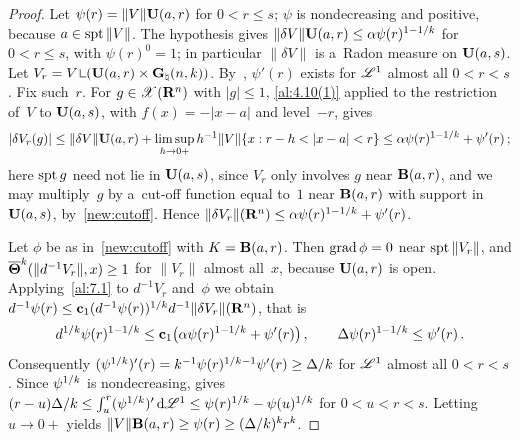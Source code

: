 \begin{proof}
    Let $\psi(r) = \|V\| \mathbf{U}(a,r)$ for $0 < r \le s$; $\psi$ is nondecreasing and positive,
    because $a \in \operatorname{spt} \|V\|$. The hypothesis gives $\|\delta V\| \mathbf{U}(a,r) \le \alpha
    \psi(r)^{1 - 1/k}$ for $0 < r \le s$, with $\psi(r)^0 = 1$; in particular $\|\delta V\|$ is
    a~Radon measure on $\mathbf{U}(a,s)$. Let $V_r = V \restrict (\oball{a}{r} \times
    \pgrass{\adim}{\vdim})$. By~\cite[2.9.19]{Federer1969}, $\psi'(r)$ exists for $\mathscr{L}^1$ almost all
    $0 < r < s$. Fix such~$r$. For $g \in \mathscr{X}(\mathbf{R}^{n})$ with $|g| \le 1$, \ref{al:4.10(1)} applied
    to the restriction of~$V$ to $\mathbf{U}(a,s)$, with $f(x) = -|x - a|$ and level~$-r$, gives
    \begin{displaymath}
        |\delta V_r(g)| \le \|\delta V\| \mathbf{U}(a,r) + \limsup_{h \to 0+} h^{-1} \|V\| \{ x : r -
        h < |x - a| < r \} \le \alpha \psi(r)^{1-1/k} + \psi'(r) \,;
    \end{displaymath}
    here $\operatorname{spt} g$ need not lie in $\mathbf{U}(a,s)$, since $V_r$ only involves $g$ near $\mathbf{B}(a,r)$,
    and we may multiply~$g$ by a~cut-off function equal to~$1$ near $\mathbf{B}(a,r)$ with support in
    $\mathbf{U}(a,s)$, by~\ref{new:cutoff}. Hence $\|\delta V_r\|(\mathbf{R}^{n}) \le \alpha
    \psi(r)^{1-1/k} + \psi'(r)$.

    Let $\phi$ be as in~\ref{new:cutoff} with $K = \mathbf{B}(a,r)$. Then $\operatorname{grad} \phi = 0$ near $\operatorname{spt}
    \|V_r\|$, and $\boldsymbol{\overline{\Theta}}^{k}(\|d^{-1} V_r\|,x) \ge 1$ for $\|V_r\|$ almost all~$x$, because
    $\mathbf{U}(a,r)$ is open. Applying~\ref{al:7.1} to $d^{-1} V_r$ and~$\phi$ we obtain $d^{-1}
    \psi(r) \le \mathbf{c}_1 (d^{-1} \psi(r))^{1/k} d^{-1} \|\delta V_r\|(\mathbf{R}^{n})$, that is
    \begin{displaymath}
        d^{1/k} \psi(r)^{1 - 1/k} \le \mathbf{c}_1 \big( \alpha \psi(r)^{1-1/k} +
        \psi'(r) \big) \,, \qquad \Delta \psi(r)^{1 - 1/k} \le \psi'(r) \,.
    \end{displaymath}
    Consequently $(\psi^{1/k})'(r) = k^{-1} \psi(r)^{1/k - 1} \psi'(r) \ge \Delta /
    k$ for $\mathscr{L}^1$ almost all $0 < r < s$. Since $\psi^{1/k}$ is nondecreasing,
    \cite[2.9.19]{Federer1969} gives $(r - u) \Delta / k \le {\textstyle\int_{u}^{r}}
    (\psi^{1/k})' \,\mathrm{d} \mathscr{L}^1 \le \psi(r)^{1/k} - \psi(u)^{1/k}$ for $0 < u < r < s$.
    Letting $u \to 0+$ yields $\|V\| \mathbf{B}(a,r) \ge \psi(r) \ge (\Delta / k)^{k} r^{k}$.
\end{proof}

